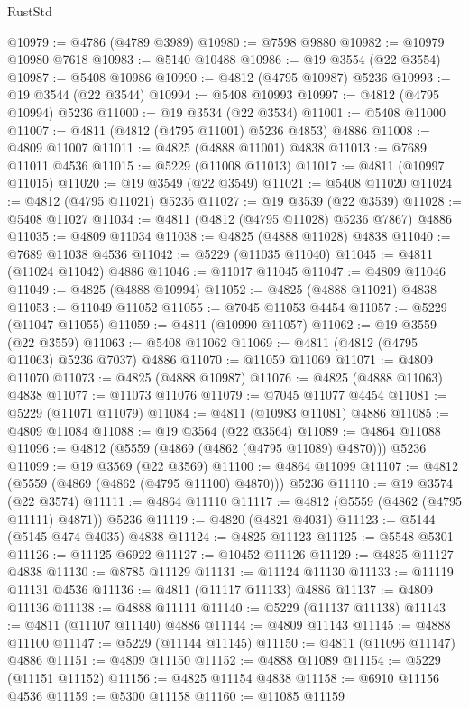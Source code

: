 \begin{lexlean}{RustStd}
\begin{coremodule}
@10979 := @4786 (@4789 @3989)
@10980 := @7598 @9880
@10982 := @10979 @10980 @7618
@10983 := @5140 @10488
@10986 := @19 @3554 (@22 @3554)
@10987 := @5408 @10986
@10990 := @4812 (@4795 @10987) @5236
@10993 := @19 @3544 (@22 @3544)
@10994 := @5408 @10993
@10997 := @4812 (@4795 @10994) @5236
@11000 := @19 @3534 (@22 @3534)
@11001 := @5408 @11000
@11007 := @4811 (@4812 (@4795 @11001) @5236 @4853) @4886
@11008 := @4809 @11007
@11011 := @4825 (@4888 @11001) @4838
@11013 := @7689 @11011 @4536
@11015 := @5229 (@11008 @11013)
@11017 := @4811 (@10997 @11015)
@11020 := @19 @3549 (@22 @3549)
@11021 := @5408 @11020
@11024 := @4812 (@4795 @11021) @5236
@11027 := @19 @3539 (@22 @3539)
@11028 := @5408 @11027
@11034 := @4811 (@4812 (@4795 @11028) @5236 @7867) @4886
@11035 := @4809 @11034
@11038 := @4825 (@4888 @11028) @4838
@11040 := @7689 @11038 @4536
@11042 := @5229 (@11035 @11040)
@11045 := @4811 (@11024 @11042) @4886
@11046 := @11017 @11045
@11047 := @4809 @11046
@11049 := @4825 (@4888 @10994)
@11052 := @4825 (@4888 @11021) @4838
@11053 := @11049 @11052
@11055 := @7045 @11053 @4454
@11057 := @5229 (@11047 @11055)
@11059 := @4811 (@10990 @11057)
@11062 := @19 @3559 (@22 @3559)
@11063 := @5408 @11062
@11069 := @4811 (@4812 (@4795 @11063) @5236 @7037) @4886
@11070 := @11059 @11069
@11071 := @4809 @11070
@11073 := @4825 (@4888 @10987)
@11076 := @4825 (@4888 @11063) @4838
@11077 := @11073 @11076
@11079 := @7045 @11077 @4454
@11081 := @5229 (@11071 @11079)
@11084 := @4811 (@10983 @11081) @4886
@11085 := @4809 @11084
@11088 := @19 @3564 (@22 @3564)
@11089 := @4864 @11088
@11096 := @4812 (@5559 (@4869 (@4862 (@4795 @11089) @4870))) @5236
@11099 := @19 @3569 (@22 @3569)
@11100 := @4864 @11099
@11107 := @4812 (@5559 (@4869 (@4862 (@4795 @11100) @4870))) @5236
@11110 := @19 @3574 (@22 @3574)
@11111 := @4864 @11110
@11117 := @4812 (@5559 (@4862 (@4795 @11111) @4871)) @5236
@11119 := @4820 (@4821 @4031)
@11123 := @5144 (@5145 @474 @4035) @4838
@11124 := @4825 @11123
@11125 := @5548 @5301
@11126 := @11125 @6922
@11127 := @10452 @11126
@11129 := @4825 @11127 @4838
@11130 := @8785 @11129
@11131 := @11124 @11130
@11133 := @11119 @11131 @4536
@11136 := @4811 (@11117 @11133) @4886
@11137 := @4809 @11136
@11138 := @4888 @11111
@11140 := @5229 (@11137 @11138)
@11143 := @4811 (@11107 @11140) @4886
@11144 := @4809 @11143
@11145 := @4888 @11100
@11147 := @5229 (@11144 @11145)
@11150 := @4811 (@11096 @11147) @4886
@11151 := @4809 @11150
@11152 := @4888 @11089
@11154 := @5229 (@11151 @11152)
@11156 := @4825 @11154 @4838
@11158 := @6910 @11156 @4536
@11159 := @5300 @11158
@11160 := @11085 @11159

\end{coremodule}
\end{lexlean}
